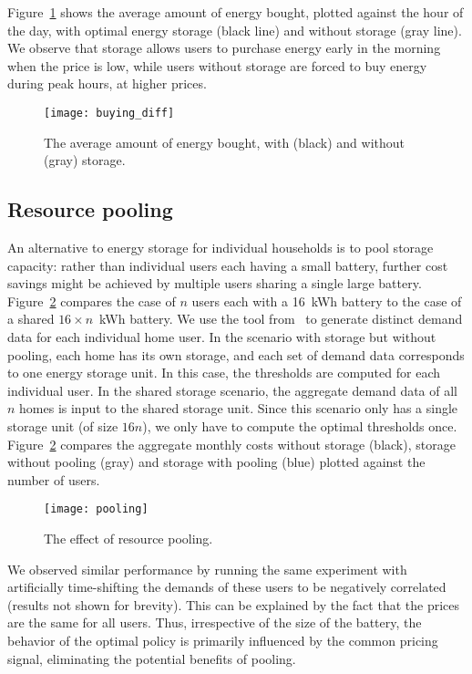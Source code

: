 \documentclass[journal]{IEEEtran}
\newcommand\1{\mathbf{1}}
\begin{document}
Figure~\ref{fig:buying_diff} shows the average amount of energy bought, plotted against the hour of the day, with optimal energy storage (black line) and without storage (gray line). We observe that storage allows users to purchase energy early in the morning when the price is low, while users without storage are forced to buy energy during peak hours, at higher prices.
\begin{figure}[h]
    \begin{center}
        \texttt{[image: buying\_diff]}
    \end{center}
    \caption{The average amount of energy bought, with (black) and without (gray) storage.}
    \label{fig:buying_diff}
\end{figure}

\subsection{Resource pooling}

An alternative to energy storage for individual households is to pool storage capacity: rather than individual users each having a small battery, further cost savings might be achieved by multiple users sharing a single large battery. Figure~\ref{fig:pooling} compares the case of $n$ users each with a 16~kWh battery to the case of a shared $16 \times n$~kWh battery. We use the tool from~\cite{RTIC10} to generate distinct demand data for each individual home user. In the scenario with storage but without pooling, each home has its own storage, and each set of demand data corresponds to one energy storage unit. In this case, the thresholds are computed for each individual user. In the shared storage scenario, the aggregate demand data of all $n$ homes is input to the shared storage unit. Since this scenario only has a single storage unit (of size $16n$), we only have to compute the optimal thresholds once.
Figure~\ref{fig:pooling} compares the aggregate monthly costs without storage (black), storage without pooling (gray) and storage with pooling (blue) plotted against the number of users.
\begin{figure}[h]
    \begin{center}
        \texttt{[image: pooling]}
    \end{center}
    \caption{The effect of resource pooling.}
    \label{fig:pooling}
\end{figure}

We observed similar performance by running the same experiment with artificially time-shifting the demands of these users to be negatively correlated (results not shown for brevity).
This can be explained by the fact that the prices are the same for all users. Thus, irrespective of the size of the battery, the behavior of the optimal policy is primarily influenced by the common pricing signal, eliminating the potential benefits of pooling. 
\end{document}

